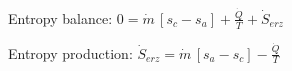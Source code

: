 Entropy balance:  
\( 0 = \dot{m} \, [s_c - s_a] + \frac{\dot{Q}}{T} + \dot{S}_{erz} \)  

Entropy production:  
\( \dot{S}_{erz} = \dot{m} \, [s_a - s_c] - \frac{\dot{Q}}{T} \)